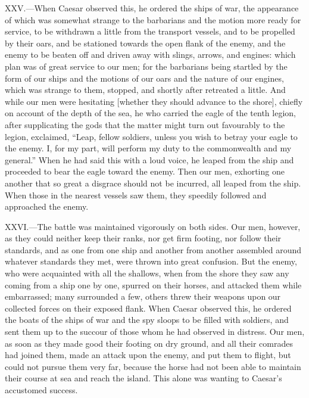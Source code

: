 XXV.—When Caesar observed this, he ordered the ships of war, the
appearance of which was somewhat strange to the barbarians and the
motion more ready for service, to be withdrawn a little from the
transport vessels, and to be propelled by their oars, and be stationed
towards the open flank of the enemy, and the enemy to be beaten off and
driven away with slings, arrows, and engines: which plan was of great
service to our men; for the barbarians being startled by the form of our
ships and the motions of our oars and the nature of our engines, which
was strange to them, stopped, and shortly after retreated a little. And
while our men were hesitating [whether they should advance to the
shore], chiefly on account of the depth of the sea, he who carried the
eagle of the tenth legion, after supplicating the gods that the matter
might turn out favourably to the legion, exclaimed, ``Leap, fellow
soldiers, unless you wish to betray your eagle to the enemy. I, for my
part, will perform my duty to the commonwealth and my general.'' When he
had said this with a loud voice, he leaped from the ship and proceeded
to bear the eagle toward the enemy. Then our men, exhorting one another
that so great a disgrace should not be incurred, all leaped from the
ship. When those in the nearest vessels saw them, they speedily followed
and approached the enemy.

XXVI.—The battle was maintained vigorously on both sides. Our men,
however, as they could neither keep their ranks, nor get firm footing,
nor follow their standards, and as one from one ship and another from
another assembled around whatever standards they met, were thrown into
great confusion. But the enemy, who were acquainted with all the
shallows, when from the shore they saw any coming from a ship one by
one, spurred on their horses, and attacked them while embarrassed; many
surrounded a few, others threw their weapons upon our collected forces
on their exposed flank. When Caesar observed this, he ordered the boats
of the ships of war and the spy sloops to be filled with soldiers, and
sent them up to the succour of those whom he had observed in distress.
Our men, as soon as they made good their footing on dry ground, and all
their comrades had joined them, made an attack upon the enemy, and put
them to flight, but could not pursue them very far, because the horse
had not been able to maintain their course at sea and reach the island.
This alone was wanting to Caesar's accustomed success.

